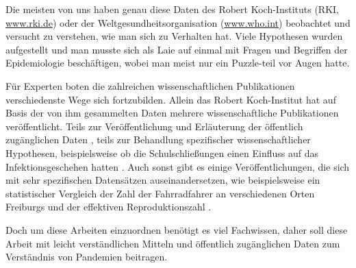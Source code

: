 Die meisten von uns haben genau diese Daten des Robert Koch-Instituts (RKI, \href{www.rki.de}{www.rki.de}) oder der Weltgesundheitsorganisation (\href{www.who.int}{www.who.int}) beobachtet und versucht zu verstehen, wie man sich zu Verhalten hat. Viele Hypothesen wurden aufgestellt und man musste sich als Laie auf einmal mit Fragen und Begriffen der Epidemiologie beschäftigen, wobei man meist nur ein Puzzle-teil vor Augen hatte.

Für Experten boten die zahlreichen wissenschaftlichen Publikationen verschiedenste Wege sich fortzubilden. Allein das Robert Koch-Institut hat auf Basis der von ihm gesammelten Daten mehrere wissenschaftliche Publikationen veröffentlicht. Teils zur Veröffentlichung und Erläuterung der öffentlich zugänglichen Daten \autocite{RKI_Bulletin}, teils zur Behandlung spezifischer wissenschaftlicher Hypothesen, beispielsweise ob die Schulschließungen einen Einfluss auf das Infektionsgeschehen hatten \autocite{OtteimKampe2020Surveillance}. Auch sonst gibt es einige Veröffentlichungen, die sich mit sehr spezifischen Datensätzen auseinandersetzen, wie beispielsweise ein statistischer Vergleich der Zahl der Fahrradfahrer an verschiedenen Orten Freiburgs und der effektiven Reproduktionszahl \autocite{Fabian}.


Doch um diese Arbeiten einzuordnen benötigt es viel Fachwissen, daher soll diese Arbeit mit leicht verständlichen Mitteln und öffentlich zugänglichen Daten zum Verständnis von Pandemien beitragen.